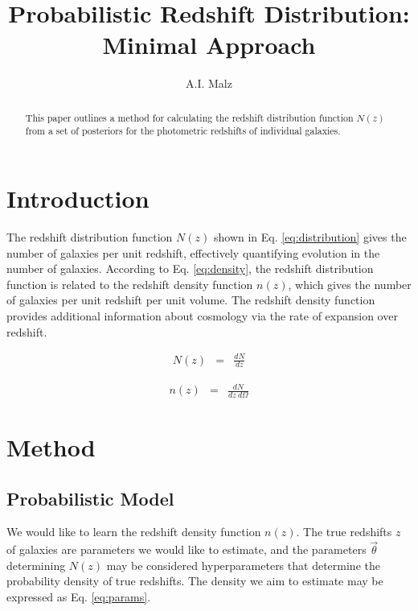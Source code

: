 \documentclass[12pt, onecolumn]{emulateapj}
\begin{document}
\title{Probabilistic Redshift Distribution: Minimal Approach}

\author{A.I. Malz}

\begin{abstract}
This paper outlines a method for calculating the redshift distribution function $N(z)$ from a set of posteriors for the photometric redshifts of individual galaxies.
\end{abstract}


\section{Introduction}

The redshift distribution function $N(z)$ shown in Eq. \ref{eq:distribution} gives the number of galaxies per unit redshift, effectively quantifying evolution in the number of galaxies.  \citep{men13}  According to Eq. \ref{eq:density}, the redshift distribution function is related to the redshift density function $n(z)$, which gives the number of galaxies per unit redshift per unit volume.  The redshift density function provides additional information about cosmology via the rate of expansion over redshift.

\begin{eqnarray}
\label{eq:distribution}
N(z) &=& \frac{dN}{dz}
\end{eqnarray}

\begin{eqnarray}
\label{eq:density}
n(z) &=& \frac{dN}{dz\ d\Omega}
\end{eqnarray}

\section{Method}

\subsection{Probabilistic Model}

We would like to learn the redshift density function $n(z)$.  The true redshifts $z$ of galaxies are parameters we would like to estimate, and the parameters $\vec{\theta}$ determining $N(z)$ may be considered hyperparameters that determine the probability density of true redshifts.  The density we aim to estimate may be expressed as Eq. \ref{eq:params}.
\end{document}
